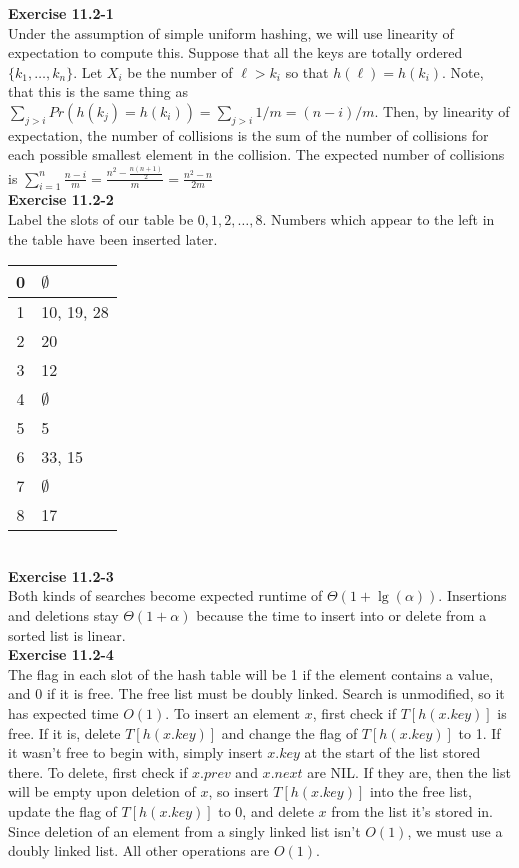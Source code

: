 \documentclass{article}
\begin{document}
\noindent\textbf{ Exercise 11.2-1} \\

Under the assumption of simple uniform hashing, we will use linearity of expectation to compute this. Suppose that all the keys are totally ordered $\{k_1,\ldots, k_{n}\}$. Let $X_i$ be the number of $\ell > k_i$ so that $h(\ell) = h(k_i)$. Note, that this is the same thing as $\sum_{j>i} Pr(h(k_j) = h(k_i)) = \sum_{j>i} 1/m = (n-i)/m$. Then, by linearity of expectation, the number of collisions is the sum of the number of collisions for each possible smallest element in the collision. The expected number of collisions is $\sum_{i=1}^n \frac{n-i}{m} = \frac{n^2  - \frac{n(n+1)}{2}}{m} = \frac{n^2 -n}{2m}$\\

\noindent\textbf{Exercise 11.2-2}\\

Label the slots of our table be $0, 1, 2, \ldots, 8$.  Numbers which appear to the left in the table have been inserted later.

\begin{tabular}{c|l}
0 &  $\emptyset$\\ \hline
1 & 10, 19, 28 \\ \hline
2 & 20 \\ \hline
3 & 12 \\ \hline
4 &  $\emptyset$ \\ \hline
5 & 5 \\ \hline
6 & 33, 15 \\ \hline
7 & $\emptyset$ \\ \hline
8 & 17 \\ \hline
\end{tabular}\\

\noindent\textbf{ Exercise 11.2-3} \\

Both kinds of searches become expected runtime of $\Theta(1+ \lg(\alpha))$. Insertions and deletions stay $\Theta(1+ \alpha)$ because the time to insert into or delete from a sorted list is linear. \\

\noindent\textbf{Exercise 11.2-4}\\

The flag in each slot of the hash table will be 1 if the element contains  a value, and 0 if it is free.  The free list must be doubly linked.  Search is unmodified, so it has expected time $O(1)$. To insert an element $x$, first check if $T[h(x.key)]$ is free.  If it is, delete $T[h(x.key)]$ and change the flag of $T[h(x.key)]$ to 1.  If it wasn't free to begin with, simply insert $x.key$ at the start of the list stored there.  To delete, first check if $x.prev$ and $x.next$ are NIL.  If they are, then the list will be empty upon deletion of $x$, so insert $T[h(x.key)]$ into the free list, update the flag of $T[h(x.key)]$ to 0, and delete $x$ from the list it's stored in.  Since deletion of an element from a singly linked list isn't $O(1)$, we must use a doubly linked list.  All other operations are $O(1)$. \\
\end{document}
